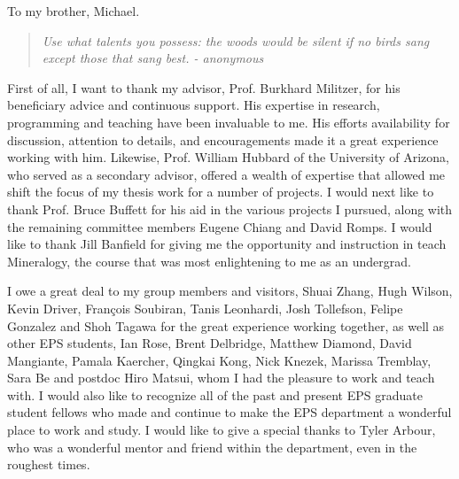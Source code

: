 \documentclass[phd,12pt]{ucbthesis}
\begin{document}
\begin{frontmatter}

\begin{dedication}
\null\vfil
\begin{center}
To my brother, Michael.\\\vspace{12pt}

\begin{quote}
    \textit{Use what talents you possess: the woods would be silent if no
birds sang except those that sang best. - anonymous
}
\end{quote}
\end{center}
\vfil\null
\end{dedication}


\tableofcontents
\clearpage
\listoffigures
\clearpage
\listoftables

\begin{acknowledgements}
First of all, I want to thank my advisor, Prof. Burkhard Militzer, for his
beneficiary advice and continuous support. His expertise in research, programming and
teaching have been invaluable to me. His efforts availability for discussion, attention to
details, and encouragements made it a great experience working with him. Likewise,
Prof. William Hubbard of the University of Arizona, who served as a secondary
advisor, offered a wealth of expertise that allowed me shift the focus of my thesis
work for a number of projects. I would next like to thank Prof. Bruce Buffett for his
aid in the various projects I pursued, along with the remaining committee members
Eugene Chiang and David Romps.
I would like to thank Jill Banfield for giving me the opportunity and instruction in
teach Mineralogy, the course that was most enlightening to me as an undergrad.

I owe a great deal to my group members and visitors, Shuai Zhang, Hugh Wilson, Kevin
Driver, Fran\c{c}ois Soubiran, Tanis Leonhardi, Josh Tollefson, Felipe Gonzalez and
Shoh Tagawa for the great experience working together, as well as other EPS students,
Ian Rose, Brent Delbridge, Matthew Diamond, David Mangiante, Pamala Kaercher, Qingkai
Kong, Nick Knezek, Marissa Tremblay, Sara Be and postdoc Hiro Matsui, whom I had the
pleasure to work and teach with.
I would also like to recognize all of the past and present EPS graduate student fellows who made
and continue to make the EPS department a wonderful place to work and study.
I would like to give a special thanks to Tyler Arbour, who was a wonderful mentor and
friend within the department, even in the roughest times.


\end{acknowledgements}
\end{frontmatter}
\end{document}
